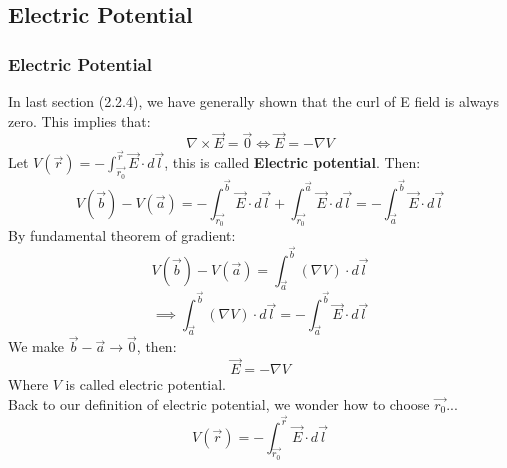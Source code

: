 \documentclass[12pt,a4paper,twoside]{article}
\begin{document}
\subsection{Electric Potential}
\subsubsection{Electric Potential}
    In last section (2.2.4), we have generally shown that the curl of E field is always zero. This implies that:
    \[\nabla\times \overrightarrow{E}=\overrightarrow{0}\iff \overrightarrow{E}=-\nabla V\]
    Let $V(\overrightarrow{r})=-\int_{\overrightarrow{r_0}}^{\overrightarrow{r}}\overrightarrow{E}\cdot d\overrightarrow{l}$, this is called \textbf{Electric potential}. Then:
    \[V(\overrightarrow{b})-V(\overrightarrow{a})=-\int_{\overrightarrow{r_0}}^{\overrightarrow{b}}\overrightarrow{E}\cdot d\overrightarrow{l}+\int_{\overrightarrow{r_0}}^{\overrightarrow{a}}\overrightarrow{E}\cdot d\overrightarrow{l}=-\int_{\overrightarrow{a}}^{\overrightarrow{b}}\overrightarrow{E}\cdot d \overrightarrow{l}\]
    By fundamental theorem of gradient:
    \[V(\overrightarrow{b})-V(\overrightarrow{a})=\int_{\overrightarrow{a}}^{\overrightarrow{b}}(\nabla V)\cdot d\overrightarrow{l}\]
    \[\implies \int_{\overrightarrow{a}}^{\overrightarrow{b}}(\nabla V)\cdot d\overrightarrow{l}=-\int_{\overrightarrow{a}}^{\overrightarrow{b}}\overrightarrow{E}\cdot d \overrightarrow{l}\]
    We make $\overrightarrow{b}-\overrightarrow{a}\to \overrightarrow{0}$, then:
        \begin{equation}
            \overrightarrow{E}=-\nabla V
            \label{eq: E-V equation}
        \end{equation}
    Where $V$ is called electric potential.\\
    \newline
    \noindent Back to our definition of electric potential, we wonder how to choose $\overrightarrow{r_0}$...
    \begin{equation}
        V(\overrightarrow{r})=-\int_{\overrightarrow{r_0}}^{\overrightarrow{r}}\overrightarrow{E}\cdot d\overrightarrow{l}
        \label{eq:potential}
    \end{equation}
\end{document}
